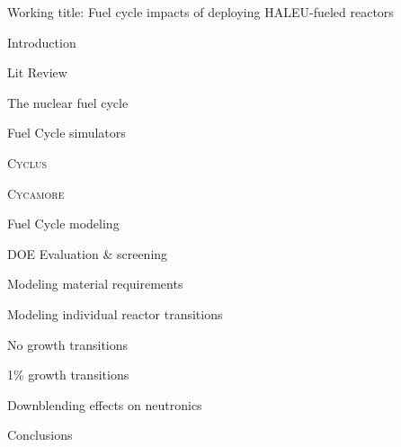 \documentclass{report}
\newcommand{\Cyclus}{\textsc{Cyclus}\xspace}%
\newcommand{\Cycamore}{\textsc{Cycamore}\xspace}%
\begin{document}
\begin{outline}
\item Working title: Fuel cycle impacts of deploying \gls{HALEU}-fueled reactors

\item Introduction
\begin{outline}
    \item
    \begin{outline}
    \item
    \end{outline}
    \item
    \begin{outline}
    \item 
    \end{outline}

\end{outline}

\item Lit Review
\begin{outline}
    \item The nuclear fuel cycle
    \begin{outline}
          \item 
    \end{outline}
    
    \item Fuel Cycle simulators
    \begin{outline}
        \item \Cyclus \cite{huff_fundamental_2016}
        \begin{outline}
              \item \Cycamore \cite{scopatz_cyclus_2015}
        \end{outline}
        \item 
    \end{outline}
    \item Fuel Cycle modeling
    \begin{outline}
          \item \gls{DOE} Evaluation \& screening \cite{wigeland_nuclear_2014}
          \begin{outline}
                \item 
          \end{outline}
    \end{outline}
\end{outline}

\item Modeling material requirements
\begin{outline}
    \item Modeling individual reactor transitions
    \begin{outline}
        \item No growth transitions
        \item 1\% growth transitions
    \end{outline}
\end{outline}
\item Downblending effects on neutronics
\item Conclusions
\end{outline}




\end{document}
